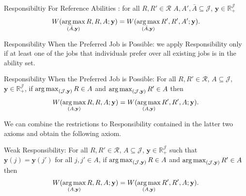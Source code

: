 Responsibiltiy For Reference Abilities : for all $R,R' \in \mathcal{R}$ $A,A',\bar A \subseteq \mathcal{J}$, $\mathbf{y} \in \mathbb{R}_{+}^{\mathcal{J}}$
\begin{equation*}
\label{ }
W(\operatorname*{arg\,max}_{(\bar A,\mathbf{y})}R,R,A;\mathbf{y})=W(\operatorname*{arg\,max}_{(\bar A,\mathbf{y})}R',R',A';\mathbf{y}).
\end{equation*}


Responsibility When the Preferred Job is Possible: we apply Responsibility only if at least one of the jobs that individuals prefer over all existing jobs is in the ability set. 

Responsibility When the Preferred Job is Possible: For all $R,R'\in \mathcal{R}$, $A\subseteq \mathcal{J}$, $\mathbf{y} \in \mathbb{R}_{+}^{\mathcal{J}}$, if $\operatorname*{arg\,max}_{(\mathcal{J},\mathbf{y})}R\in A$ and $\operatorname*{arg\,max}_{(\mathcal{J},\mathbf{y})}R'\in A$ then
\begin{equation*}
\label{ }
W(\operatorname*{arg\,max}_{(A,\mathbf{y})}R,R,A;\mathbf{y})=W(\operatorname*{arg\,max}_{(A,\mathbf{y})}R',R',A;\mathbf{y}).
\end{equation*}


We can combine the restrictions to Responsibility contained in the latter two axioms and obtain the following axiom.

Weak Responsibility: For all $R,R'\in \mathcal{R}$, $A\subseteq \mathcal{J}$, $\mathbf{y} \in \mathbb{R}_{+}^{\mathcal{J}}$ such that $\mathbf{y}(j)=\mathbf{y}(j')$ for all $j,j'\in A$, if $\operatorname*{arg\,max}_{(\mathcal{J},\mathbf{y})}R\in A$ and $\operatorname*{arg\,max}_{(\mathcal{J},\mathbf{y})}R'\in A$ then
\begin{equation*}
\label{ }
W(\operatorname*{arg\,max}_{(A,\mathbf{y})}R,R,A;\mathbf{y})=W(\operatorname*{arg\,max}_{(A,\mathbf{y})}R',R',A;\mathbf{y}).
\end{equation*}
